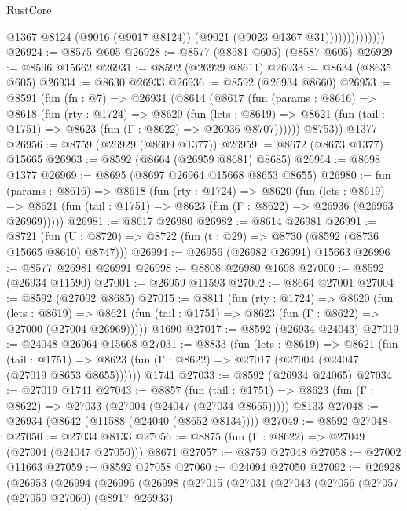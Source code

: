 \begin{lexlean}{RustCore}
\begin{coremodule}
                            @1367
                            @8124
                            (@9016 (@9017 @8124))
                            (@9021 (@9023 @1367 @31))))))))))))))
@26924 := @8575 @605
@26928 := @8577 (@8581 @605) (@8587 @605)
@26929 := @8596 @15662
@26931 := @8592 (@26929 @8611)
@26933 := @8634 (@8635 @605)
@26934 := @8630 @26933
@26936 := @8592 (@26934 @8660)
@26953 := @8591
    (fun (fn : @7) =>
    @26931
      (@8614
        (@8617
          (fun (params : @8616) =>
          @8618
            (fun (rty : @1724) =>
            @8620
              (fun (lets : @8619) =>
              @8621 (fun (tail : @1751) => @8623 (fun (Γ : @8622) => @26936 @8707))))))
        @8753))
    @1377
@26956 := @8759 (@26929 (@8609 @1377))
@26959 := @8672 (@8673 @1377) @15665
@26963 := @8592 (@8664 (@26959 @8681) @8685)
@26964 := @8698 @1377
@26969 := @8695 (@8697 @26964 @15668 @8653 @8655)
@26980 := fun (params : @8616) =>
  @8618
    (fun (rty : @1724) =>
    @8620
      (fun (lets : @8619) =>
      @8621 (fun (tail : @1751) => @8623 (fun (Γ : @8622) => @26936 (@26963 @26969)))))
@26981 := @8617 @26980
@26982 := @8614 @26981
@26991 := @8721
    (fun (U : @8720) => @8722 (fun (t : @29) => @8730 (@8592 (@8736 @15665 @8610) @8747)))
@26994 := @26956 (@26982 @26991) @15663
@26996 := @8577 @26981 @26991
@26998 := @8808 @26980 @1698
@27000 := @8592 (@26934 @11590)
@27001 := @26959 @11593
@27002 := @8664 @27001
@27004 := @8592 (@27002 @8685)
@27015 := @8811
    (fun (rty : @1724) =>
    @8620
      (fun (lets : @8619) =>
      @8621 (fun (tail : @1751) => @8623 (fun (Γ : @8622) => @27000 (@27004 @26969)))))
    @1690
@27017 := @8592 (@26934 @24043)
@27019 := @24048 @26964 @15668
@27031 := @8833
    (fun (lets : @8619) =>
    @8621
      (fun (tail : @1751) =>
      @8623 (fun (Γ : @8622) => @27017 (@27004 (@24047 (@27019 @8653 @8655))))))
    @1741
@27033 := @8592 (@26934 @24065)
@27034 := @27019 @1741
@27043 := @8857
    (fun (tail : @1751) => @8623 (fun (Γ : @8622) => @27033 (@27004 (@24047 (@27034 @8655)))))
    @8133
@27048 := @26934 (@8642 (@11588 (@24040 (@8652 @8134))))
@27049 := @8592 @27048
@27050 := @27034 @8133
@27056 := @8875 (fun (Γ : @8622) => @27049 (@27004 (@24047 @27050))) @8671
@27057 := @8759 @27048
@27058 := @27002 @11663
@27059 := @8592 @27058
@27060 := @24094 @27050
@27092 := @26928
    (@26953
      (@26994
        (@26996
          (@26998
            (@27015
              (@27031
                (@27043
                  (@27056
                    (@27057
                      (@27059 @27060)
                      (@8917 @26933)

\end{coremodule}
\end{lexlean}
